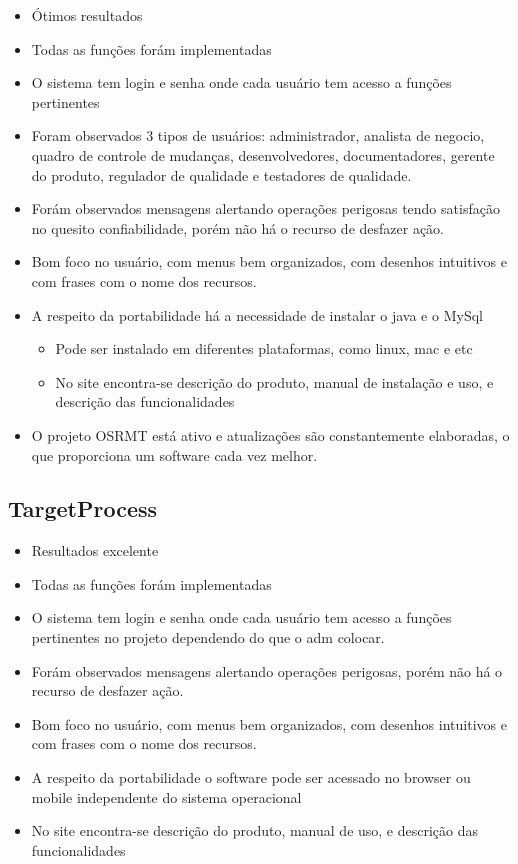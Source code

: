   \begin{itemize}
    \item Ótimos resultados
    \item Todas as funções forám implementadas
    \item O sistema tem login e senha onde cada usuário tem acesso a funções pertinentes
    \item Foram observados 3 tipos de usuários: administrador, analista de negocio, quadro de controle de mudanças, desenvolvedores,
      documentadores, gerente do produto, regulador de qualidade e testadores de qualidade.
    \item Forám observados mensagens alertando operações perigosas tendo satisfação no quesito confiabilidade, porém não
      há o recurso de desfazer ação.
    \item Bom foco no usuário, com menus bem organizados, com desenhos intuitivos e com frases com o nome dos recursos.
    \item A respeito da portabilidade há a necessidade de instalar o java e o MySql
      \begin{itemize}
        \item Pode ser instalado em diferentes plataformas, como linux, mac e etc
        \item No site encontra-se descrição do produto, manual de instalação e uso, e descrição das funcionalidades
      \end{itemize}
    \item O projeto OSRMT está ativo e atualizações são constantemente elaboradas, o que proporciona um software cada vez melhor.
  \end{itemize}

\subsection{TargetProcess}

  \begin{itemize}
    \item Resultados excelente
    \item Todas as funções forám implementadas
    \item O sistema tem login e senha onde cada usuário tem acesso a funções pertinentes no projeto dependendo do que o adm colocar.
    \item Forám observados mensagens alertando operações perigosas, porém não há o recurso de desfazer ação.
    \item Bom foco no usuário, com menus bem organizados, com desenhos intuitivos e com frases com o nome dos recursos.
    \item A respeito da portabilidade o software pode ser acessado no browser ou mobile independente do sistema operacional
    \item No site encontra-se descrição do produto, manual de uso, e descrição das funcionalidades
  \end{itemize}

